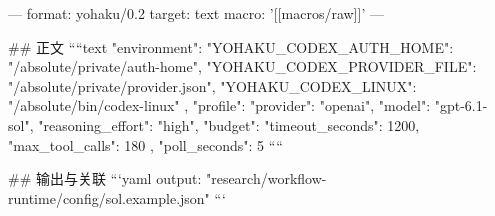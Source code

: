 ---
format: yohaku/0.2
target: text
macro: '[[macros/raw]]'
---

## 正文
````text
{
  "environment": {
    "YOHAKU_CODEX_AUTH_HOME": "/absolute/private/auth-home",
    "YOHAKU_CODEX_PROVIDER_FILE": "/absolute/private/provider.json",
    "YOHAKU_CODEX_LINUX": "/absolute/bin/codex-linux"
  },
  "profile": {
    "provider": "openai",
    "model": "gpt-6.1-sol",
    "reasoning_effort": "high",
    "budget": {
      "timeout_seconds": 1200,
      "max_tool_calls": 180
    }
  },
  "poll_seconds": 5
}
````

## 输出与关联
```yaml
output: "research/workflow-runtime/config/sol.example.json"
```
